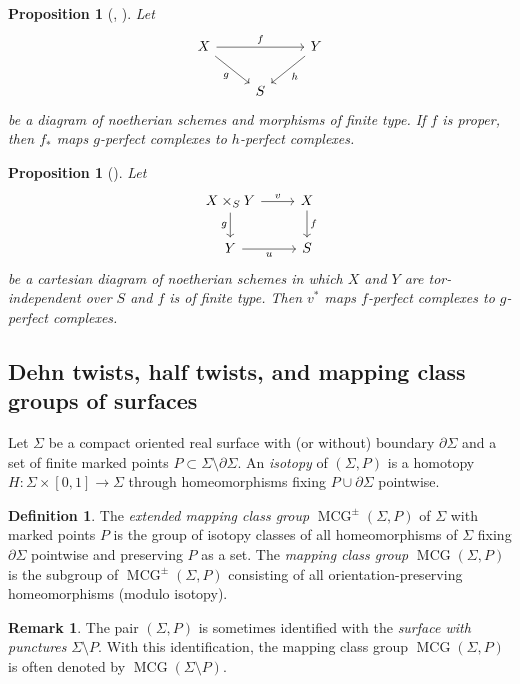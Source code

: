 \documentclass[12pt]{amsart}
\numberwithin{equation}{section}
\theoremstyle{plain}
\newtheorem{proposition}[theorem]{Proposition}
\theoremstyle{definition}
\newtheorem{definition}[theorem]{Definition}
\newtheorem{remark}[theorem]{Remark}
\DeclareMathOperator{\MCG}{\mathrm{MCG}}
\begin{document}
\begin{proposition}[{\cite[Proposition 2.7]{MR3720794}, \cite[Proposition 3.5]{MR4604981}}]\label{prop:proper-push-forward-of-f-perfect}
    Let
    \[
        \begin{tikzcd}
            X \ar[rr, "f"] \ar[rd, "g"']& & Y \ar[ld, "h"]\\
            & S &
        \end{tikzcd}
    \]
    be a diagram of noetherian schemes and morphisms of finite type.
    If $f$ is proper, then $f_*$ maps $g$-perfect complexes to $h$-perfect complexes.
\end{proposition}
\begin{proposition}[{\cite[Proposition 3.11]{MR4604981}}]
    Let
    \[
        \begin{tikzcd}
            X \times_S Y \arrow[r,"v"]\arrow[d, "g"'] & X \arrow[d,"f"]\\
            Y \arrow[r, "u"']& S
        \end{tikzcd}
    \]
    be a cartesian diagram of noetherian schemes in which $X$ and $Y$ are tor-independent over $S$ and $f$ is of finite type.
    Then $v^*$ maps $f$-perfect complexes to $g$-perfect complexes.
\end{proposition}



\subsection{Dehn twists, half twists, and mapping class groups of surfaces}\label{subsection:Dehn-twists-and-mapping-class-groups}
Let $\Sigma$ be a compact oriented real surface with (or without) boundary $\partial \Sigma$
and a set of finite marked points $P \subset \Sigma \setminus \partial \Sigma$.
An \emph{isotopy} of $(\Sigma, P)$ is
a homotopy $H \colon \Sigma \times [0, 1] \to \Sigma$ through homeomorphisms fixing $P \cup \partial \Sigma$ pointwise.

\begin{definition}
    The \emph{extended mapping class group} $\MCG^{\pm}(\Sigma, P)$ of $\Sigma$ with marked points $P$ is
    the group of isotopy classes of all homeomorphisms of $\Sigma$
    fixing $\partial \Sigma$ pointwise
    and preserving $P$ as a set.
    The \emph{mapping class group} $\MCG(\Sigma, P)$ is
    the subgroup of $\MCG^{\pm}(\Sigma, P)$ consisting of all orientation-preserving homeomorphisms (modulo isotopy).
\end{definition}
\begin{remark}
    The pair $(\Sigma, P)$ is sometimes identified with the \emph{surface with punctures} $\Sigma \setminus P$.
    With this identification, the mapping class group $\MCG(\Sigma, P)$ is often denoted by $\MCG(\Sigma \setminus P)$.
\end{remark}
\end{document}
